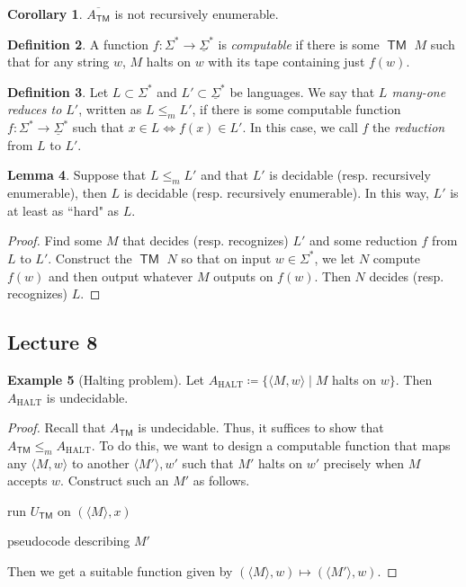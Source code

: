 \documentclass[10pt,letterpaper,cm]{nupset}
\theoremstyle{definition}
\newtheorem{definition}{Definition}[subsection]
\newtheorem{exmp}[definition]{Example}
\theoremstyle{theorem}
\newtheorem{lemma}[definition]{Lemma}
\newtheorem{corollary}[definition]{Corollary}
\theoremstyle{remark}
\newcommand{\1}{\mathbf{1}}
\newcommand{\0}{\vec 0}
\DeclareMathOperator{\TM}{\mathsf{TM}}
\begin{document}
\begin{corollary}
$\overline{A_{\TM}}$ is not recursively enumerable. 
\end{corollary}

\begin{definition}
A function $f: \Sigma^{\ast} \to \underline{\Sigma}^{\ast}$ is \textit{computable} if there is some $\TM$ $M$ such that for any string $w$, $M$ halts on $w$ with its tape containing just $f(w)$. 
\end{definition}

\begin{definition}
Let $L\subset \Sigma^{\ast}$ and $L' \subset \underline{\Sigma}^{\ast}$ be languages. We say that \textit{$L$ many-one reduces to $L'$}, written as $L \leq_m L'$, if there is some computable function $f: \Sigma^{\ast} \to \underline{\Sigma}^{\ast}$ such that $x\in L \iff f(x) \in L'$. In this case, we call $f$ the \textit{reduction} from $L$ to $L'$.
\end{definition}

\begin{lemma}
Suppose that $L \leq_m L'$ and that $L'$ is decidable (resp. recursively enumerable), then $L$ is decidable (resp. recursively enumerable). In this way, $L'$ is at least as ``hard" as $L$.
\end{lemma}
\begin{proof}
Find some $M$ that decides (resp. recognizes) $L'$ and some reduction $f$ from $L$ to $L'$. Construct the $\TM$ $N$ so that on input $w\in \Sigma^{\ast}$, we let $N$ compute $f(w)$ and then output whatever $M$ outputs on $f(w)$. Then $N$ decides (resp. recognizes) $L$. 
\end{proof}

\subsection{Lecture 8}

\begin{exmp}[Halting problem]
Let $A_{\text{HALT}} \coloneqq \{\langle M, w \rangle \mid M$ halts on $w\}$. Then $A_{\text{HALT}}$ is undecidable.
\end{exmp}
\begin{proof}
Recall that $A_{\TM}$ is undecidable. Thus, it suffices to show that $A_{\TM} \leq_m A_{\text{HALT}}$. To do this, we want to design a computable function that maps any $\langle M, w \rangle$ to another $\langle M' \rangle, w'$ such that $M'$ halts on $w'$ precisely when $M$ accepts $w$. Construct such an $M'$ as follows.

\smallskip

\begin{algorithm}[H]
    {run $U_{\TM}$ on $(\langle M \rangle, x)$}\;
     \eIf{$U_{\TM}$ accepts}{accept}{
     \While{true}{pass}
     } 
      \caption{pseudocode describing $M'$}
\end{algorithm}

\smallskip

Then we get a suitable function given by $(\langle M \rangle , w) \mapsto (\langle M' \rangle, w)$.
\end{proof}
\end{document}

